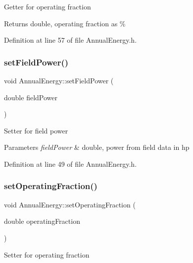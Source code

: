 Getter for operating fraction \begin{DoxyReturn}{Returns}
double, operating fraction as \% 
\end{DoxyReturn}


Definition at line 57 of file Annual\+Energy.\+h.

\mbox{\label{class_annual_energy_a4f7212fcf2f6fcd2b12f36ca26a368a1}} 
\subsubsection{\texorpdfstring{set\+Field\+Power()}{setFieldPower()}}
{\footnotesize\ttfamily void Annual\+Energy\+::set\+Field\+Power (\begin{DoxyParamCaption}\item[{double}]{field\+Power }\end{DoxyParamCaption})\hspace{0.3cm}{\ttfamily [inline]}}

Setter for field power 
\begin{DoxyParams}{Parameters}
{\em field\+Power} & double, power from field data in hp \\
\hline
\end{DoxyParams}


Definition at line 49 of file Annual\+Energy.\+h.

\mbox{\label{class_annual_energy_a5c127c7d5e2a5e4f50559f8b546e8998}} 
\subsubsection{\texorpdfstring{set\+Operating\+Fraction()}{setOperatingFraction()}}
{\footnotesize\ttfamily void Annual\+Energy\+::set\+Operating\+Fraction (\begin{DoxyParamCaption}\item[{double}]{operating\+Fraction }\end{DoxyParamCaption})\hspace{0.3cm}{\ttfamily [inline]}}

Setter for operating fraction



